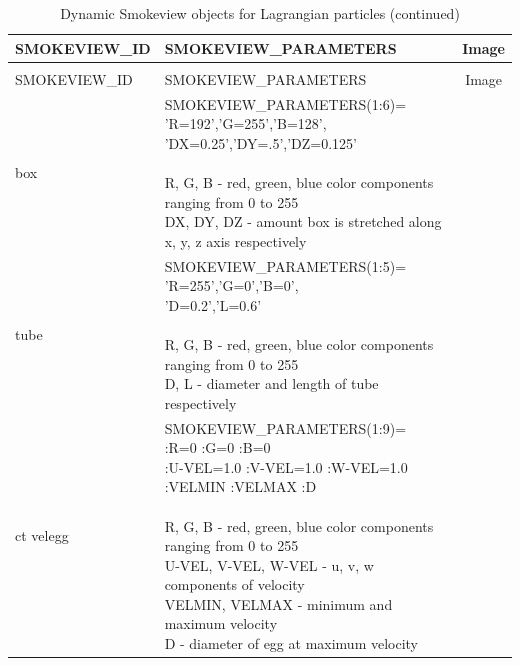 \begin{longtable}[ht]{|l|l|c|}
\caption{Dynamic Smokeview objects for Lagrangian particles}
\label{tab:devices_dynamic2}
\\ \hline
{\ct SMOKEVIEW\_ID}  & {\ct SMOKEVIEW\_PARAMETERS} & Image  \\ \hline \hline
\endfirsthead
\caption{Dynamic Smokeview objects for Lagrangian particles (continued)}
\\ \hline
{\ct SMOKEVIEW\_ID}  & {\ct SMOKEVIEW\_PARAMETERS} & Image  \\ \hline \hline
\endhead

{\ct box} &
\parbox[c]{\boxwidth}{
{\ct SMOKEVIEW\_PARAMETERS(1:6)=}\\
{\ct 'R=192','G=255','B=128',}\\
{\ct 'DX=0.25','DY=.5','DZ=0.125'}\\  \\
R, G, B - red, green, blue color components ranging from 0 to 255\\
DX, DY, DZ - amount box is stretched along x, y, z axis respectively
} &
 \\ \hline

{\ct tube} &
\parbox[c]{\boxwidth}{
{\ct SMOKEVIEW\_PARAMETERS(1:5)=}\\
{\ct 'R=255','G=0','B=0',}\\
{\ct 'D=0.2','L=0.6'}\\ \\
R, G, B - red, green, blue color components ranging from 0 to 255\\
D, L - diameter and length of tube respectively
} &
 \\ \hline

{ct velegg} &
\parbox[c]{\boxwidth}{
{\ct SMOKEVIEW\_PARAMETERS(1:9)=}\\
:R=0 :G=0 :B=0 \\
:U-VEL=1.0 :V-VEL=1.0 :W-VEL=1.0  \\
:VELMIN :VELMAX :D \\  \\
R, G, B - red, green, blue color components ranging from 0 to 255\\
U-VEL, V-VEL, W-VEL - u, v, w components of velocity\\
VELMIN, VELMAX - minimum and maximum velocity\\
D - diameter of egg at maximum velocity
} &
 \\ \hline


\end{longtable}
